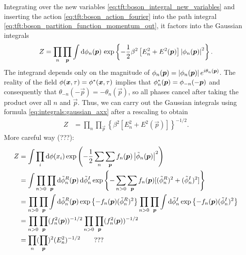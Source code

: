 Integrating over the new variables \eqref{eq:tft:boson_integral_new_variables} and inserting the action \eqref{eq:tft:boson_action_fourier} into the path integral \eqref{eq:tft:boson_partition_function_momentum_out}, it factors into the Gaussian integrals
\begin{equation}
\begin{split}
	Z & =
	\prod_{n} \prod_{{\bm{p}}}
	\int \mathop{}\!\mathrm{d} \phi_n({\bm{p}}) \,
	\exp \left\{
		-\frac12 \beta^2 \left[
			E_n^2 + E^2({\bm{p}})
		\right]
		\left\lvert \phi_n({\bm{p}}) \right\rvert^2
	\right\} . \\
\end{split}
\label{eq:tft:boson_gaussian_integral}
\end{equation}
The integrand depends only on the magnitude of $\phi_n({\bm{p}}) = \left\lvert \phi_n({\bm{p}}) \right\rvert e^{i \theta_n({\bm{p}})}$.
The reality of the field $\phi({\bm{x}}, \tau) = {\phi}^*({\bm{x}}, \tau)$ implies that ${\phi}^*_n({\bm{p}}) = \phi_{-n}(-{\bm{p}})$ and consequently that $\theta_{-n}(-\vec{p}) = -\theta_n(\vec{p})$, so all phases cancel after taking the product over all $n$ and $\vec{p}$.
Thus, we can carry out the Gaussian integrals using formula \eqref{eq:integrals:gaussian_axx} after a rescaling to obtain
\begin{equation}
\begin{split}
	Z & =
	\prod_{n} \prod_{\vec{p}} \left\{
		\beta^2 \left[
			E_n^2 + E^2(\vec{p})
		\right]
	\right\}^{-1/2} .
\end{split}
\end{equation}
\iffalse
More careful way (???):
\begin{equation}
\begin{split}
	Z &= \int \prod_i \mathop{}\!\mathrm{d} \phi(x_i) \exp \left( -\frac12 \sum_n \sum_{\bm{p}} f_n({\bm{p}}) \left\lvert \tilde\phi_n({\bm{p}}) \right\rvert^2 \right) \\
	  &= \int \prod_{n>0} \prod_{\bm{p}} \mathop{}\!\mathrm{d} \tilde\phi_n^R({\bm{p}}) \mathop{}\!\mathrm{d} \tilde\phi_n^I \exp \left\{ -\sum_{n>0} \sum_{\bm{p}} f_n({\bm{p}}) [(\tilde\phi_n^R)^2 + (\tilde\phi_n^I)^2] \right\} \\
	  &= \prod_{n>0} \prod_{\bm{p}} \int \mathop{}\!\mathrm{d} \tilde\phi_n^R({\bm{p}}) \exp \left\{ -f_n({\bm{p}}) (\tilde\phi_n^R)^2 \right\} \prod_{n>0} \prod_{\bm{p}} \int \mathop{}\!\mathrm{d} \tilde\phi_n^I \exp \left\{ -f_n({\bm{p}}) (\tilde\phi_n^I)^2 \right\} \\
	  &= \prod_{n>0} \prod_{\bm{p}} (f^2_n({\bm{p}}))^{-1/2} \prod_{n>0} \prod_{\bm{p}} (f^2_n({\bm{p}}))^{-1/2} \\
	  &= \prod_n (\prod_{\bm{p}})^2 (E_n^2)^{-1/2} \qquad \text{???} \\
\end{split}
\end{equation}
